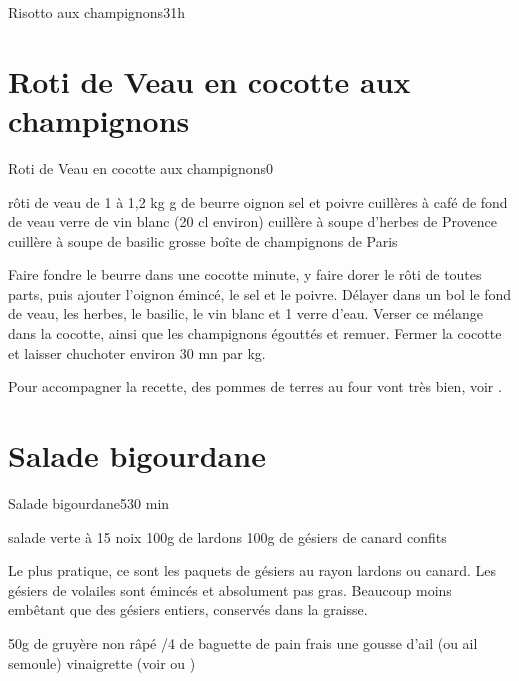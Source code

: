 {\begin{recette}{Risotto aux champignons}{3}{1h}{}
\end{recette}

\section{Roti de Veau en cocotte aux champignons}
\begin{recette}{Roti de Veau en cocotte aux champignons}{0}{}{}
\begin{ingredients}
 rôti de veau de 1 à 1,2 kg
 g de beurre
 oignon
\ingredient sel et poivre
 cuillères à café de fond de veau
 verre de vin blanc (20 cl environ)
 cuillère à soupe d'herbes de Provence
 cuillère à soupe de basilic
 grosse boîte de champignons de Paris
\end{ingredients}

\begin{preparation}
\etape Faire fondre le beurre dans une cocotte minute, y faire dorer le rôti de toutes parts, puis ajouter l'oignon émincé, le 
sel et le poivre.
\etape Délayer dans un bol le fond de veau, les herbes, le basilic, le vin blanc et 1 verre d'eau. Verser ce mélange dans la 
cocotte, ainsi que les champignons égouttés et remuer.
\etape Fermer la cocotte et laisser chuchoter environ 30 mn par kg.
\end{preparation}

\begin{remarque}
Pour accompagner la recette, des pommes de terres au four vont très bien, voir .
\end{remarque}
\end{recette}

\section{Salade bigourdane}
\begin{recette}{Salade bigourdane}{5}{30 min}{}
\begin{ingredients}
\ingredient salade verte
 à 15 noix
\ingredient 100g de lardons
\ingredient 100g de gésiers de canard confits
\begin{remarque}
Le plus pratique, ce sont les paquets de gésiers au rayon lardons ou canard. Les gésiers de volailes sont émincés et absolument 
pas gras. Beaucoup moins embêtant que des gésiers entiers, conservés dans la graisse.
\end{remarque}
\ingredient 50g de gruyère non râpé
/4 de baguette de pain frais
\ingredient une gousse d'ail (ou ail semoule)
\ingredient vinaigrette (voir  ou )


\end{ingredients}
\end{recette}}
